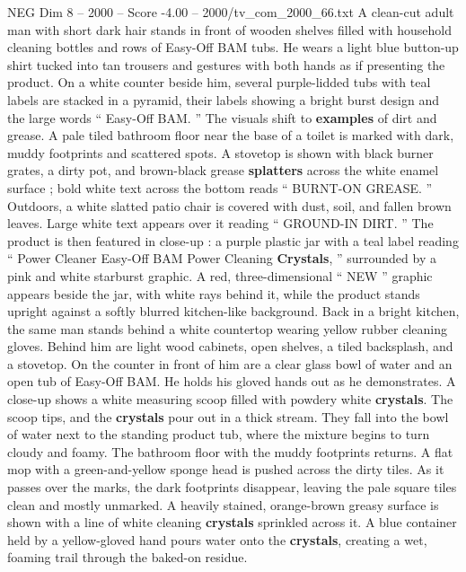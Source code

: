 \begin{textsample}{NEG Dim 8 – 2000 – Score -4.00 – 2000/tv\_com\_2000\_66.txt}  \label{ex:f8_neg_082}
A clean-cut adult man with short dark hair stands in front of wooden shelves filled with household cleaning bottles and rows of Easy-Off BAM tubs.
He wears a light blue button-up shirt tucked into tan trousers and gestures with both hands as if presenting the product.
On a white counter beside him, several purple-lidded tubs with teal labels are stacked in a pyramid, their labels showing a bright burst design and the large words “ Easy-Off BAM. ” The visuals shift to \textbf{examples} of dirt and grease.
A pale tiled bathroom floor near the base of a toilet is marked with dark, muddy footprints and scattered spots.
A stovetop is shown with black burner grates, a dirty pot, and brown-black grease \textbf{splatters} across the white enamel surface ; bold white text across the bottom reads “ BURNT-ON GREASE. ” Outdoors, a white slatted patio chair is covered with dust, soil, and fallen brown leaves.
Large white text appears over it reading “ GROUND-IN DIRT. ” The product is then featured in close-up : a purple plastic jar with a teal label reading “ Power Cleaner Easy-Off BAM Power Cleaning \textbf{Crystals}, ” surrounded by a pink and white starburst graphic.
A red, three-dimensional “ NEW ” graphic appears beside the jar, with white rays behind it, while the product stands upright against a softly blurred kitchen-like background.
Back in a bright kitchen, the same man stands behind a white countertop wearing yellow rubber cleaning gloves.
Behind him are light wood cabinets, open shelves, a tiled backsplash, and a stovetop.
On the counter in front of him are a clear glass bowl of water and an open tub of Easy-Off BAM.
He holds his gloved hands out as he demonstrates.
A close-up shows a white measuring scoop filled with powdery white \textbf{crystals}.
The scoop tips, and the \textbf{crystals} pour out in a thick stream.
They fall into the bowl of water next to the standing product tub, where the mixture begins to turn cloudy and foamy.
The bathroom floor with the muddy footprints returns.
A flat mop with a green-and-yellow sponge head is pushed across the dirty tiles.
As it passes over the marks, the dark footprints disappear, leaving the pale square tiles clean and mostly unmarked.
A heavily stained, orange-brown greasy surface is shown with a line of white cleaning \textbf{crystals} sprinkled across it.
A blue container held by a yellow-gloved hand pours water onto the \textbf{crystals}, creating a wet, foaming trail through the baked-on residue.

\end{textsample}
